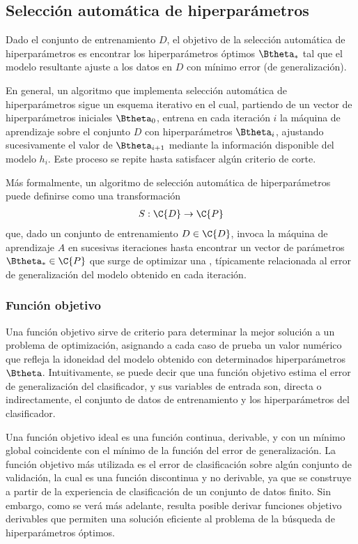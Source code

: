\subsection{Selección automática de hiperparámetros}
%
Dado el conjunto de entrenamiento $D$, el objetivo de la selección
automática de hiperparámetros es encontrar los hiperparámetros óptimos
$\Btheta_*$ tal que el modelo resultante ajuste a los datos en $D$ con
mínimo error (de generalización).

En general, un algoritmo que implementa selección automática de
hiperparámetros sigue un esquema iterativo en el cual, partiendo de un
vector de hiperparámetros iniciales $\Btheta_0$, entrena en cada
iteración $i$ la máquina de aprendizaje sobre el conjunto $D$ con
hiperparámetros $\Btheta_i$, ajustando sucesivamente el valor de
$\Btheta_{i+1}$ mediante la información disponible del modelo
$h_i$. Este proceso se repite hasta satisfacer algún criterio de
corte.

Más formalmente, un algoritmo de selección automática de
hiperparámetros puede definirse como una transformación
%
\begin{align}
  S:\C{D}\rightarrow\C{P}
\end{align}
%
que, dado un conjunto de entrenamiento ${D}\in\C{D}$, invoca la máquina de
aprendizaje $A$ en sucesivas iteraciones hasta encontrar un vector de
parámetros $\Btheta_*\in\C{P}$ que surge de optimizar una , típicamente relacionada al error de generalización del
modelo obtenido en cada iteración.
%
\subsubsection{Función objetivo}
%
Una función objetivo sirve de criterio para determinar la mejor
solución a un problema de optimización, asignando a cada caso de
prueba un valor numérico que refleja la idoneidad del modelo obtenido
con determinados hiperparámetros $\Btheta$.
Intuitivamente, se puede decir que una función objetivo estima el
error de generalización del clasificador, y sus variables de entrada
son, directa o indirectamente, el conjunto de datos de entrenamiento y
los hiperparámetros del clasificador.

Una función objetivo ideal es una función continua, derivable, y con
un mínimo global coincidente con el mínimo de la función del error de
generalización. La función objetivo más utilizada es el error
de clasificación sobre algún conjunto de validación, la cual es una
función discontinua y no derivable, ya que se construye a partir de la
experiencia de clasificación de un conjunto de datos finito.
Sin embargo, como se verá más adelante, resulta posible derivar
funciones objetivo derivables que permiten una solución eficiente al
problema de la búsqueda de hiperparámetros óptimos.
